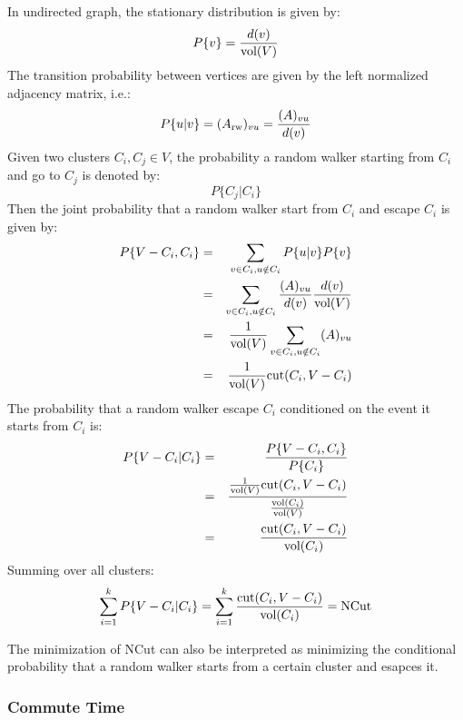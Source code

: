 In undirected graph, the stationary distribution is given by:
\begin{equation}
	P\{v\} = \frac{d(v)}{\text{vol}(V)}
\end{equation}
The transition probability between vertices are given by the 
left normalized adjacency matrix, i.e.:
\begin{equation}
	P\{u|v\} = (A_{\text{rw}})_{vu} = \frac{(A)_{vu}}{d(v)} 
\end{equation}
Given two clusters $ C_i, C_j \in V $, the probability a random walker 
starting from $ C_i $ and go to $ C_j $ is denoted by:
\begin{equation}
	P\{C_j|C_i\} 
\end{equation}
Then the joint probability that a random walker 
start from $ C_i $ and escape $ C_i $ is given by:
\begin{eqnarray}
	P\{V-C_i,C_i\} &=& \sum_{v \in C_i, u \notin C_i}{P\{u|v\}P\{v\}} \nonumber \\
	&=& \sum_{v \in C_i, u \notin C_i} \frac{(A)_{vu}}{d(v)}  \frac{d(v)}{\text{vol}(V)} \nonumber \\
	&=& \frac{1}{\text{vol}(V)} \sum_{v \in C_i, u \notin C_i} (A)_{vu} \nonumber \\
	&=& \frac{1}{\text{vol}(V)} \text{cut}(C_i, V - C_i)
\end{eqnarray}
The probability that a random walker escape 
$ C_i $ conditioned on the event it starts from $ C_i $ is:
\begin{eqnarray}
	P\{V-C_i|C_i\} &=& \frac{P\{V-C_i,C_i\}}{P\{C_i\}} \nonumber \\
	&=&  \frac{\frac{1}{\text{vol}(V)}\text{cut}(C_i, V - C_i)}{\frac{\text{vol}(C_i)}{\text{vol}(V)}} \nonumber \\
	&=& \frac{\text{cut}(C_i, V - C_i)}{\text{vol}(C_i)}
\end{eqnarray}
Summing over all clusters:
\begin{equation}
	\sum_{i=1}^{k}{ P\{V-C_i|C_i\} }  
	= \sum_{i=1}^{k} \frac{\text{cut}(C_i, V - C_i)}{\text{vol}(C_i)}
	= \text{NCut}
\end{equation}

The minimization of NCut can also be interpreted as minimizing the 
conditional probability 
that a random walker starts from a certain cluster and esapces it. 

\subsubsection{Commute Time}
\label{sec:commute}

